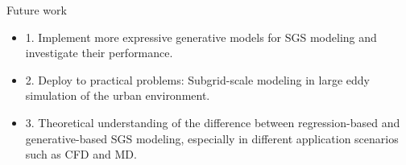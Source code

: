 \documentclass[paper slide]{beamer}
\begin{document}
\begin{frame}{Future work}
	\begin{itemize}
		\item 1. Implement more expressive generative models for SGS modeling and
		investigate their performance.
		\item 2. Deploy to practical problems: Subgrid-scale modeling in large
		eddy simulation of the
		urban environment.
		\item 3. Theoretical understanding of the difference between
		regression-based and generative-based SGS modeling, especially in different
		application scenarios such as CFD and MD.
	\end{itemize}
\end{frame}

 
 


 
        
\end{document}
